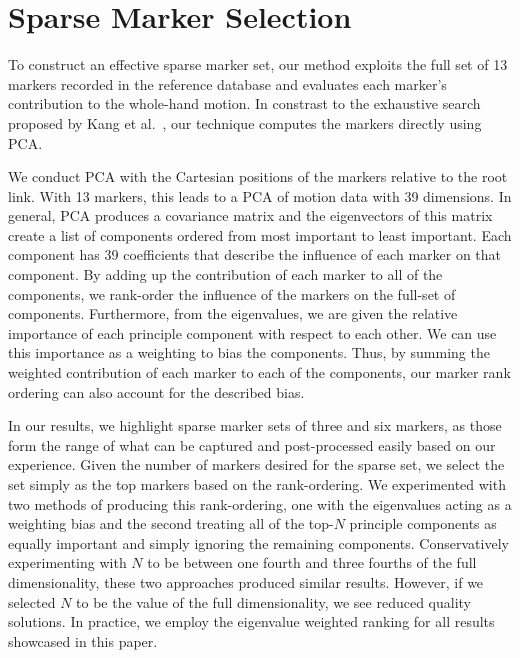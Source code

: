 
\section{Sparse Marker Selection} 
To construct an effective sparse marker set, our method exploits the full set of 13 markers recorded in the reference database and evaluates each marker's contribution to the whole-hand motion. 
In constrast to the exhaustive search proposed by Kang et al.~, our technique computes the markers directly using PCA.

We conduct PCA with the Cartesian positions of the markers relative to the root link. With 13 markers, this leads to a PCA of motion data with 39 dimensions. In general, PCA produces a covariance matrix and the eigenvectors of this matrix create a list of components ordered from most important to least important.  
%
Each component has 39 coefficients that describe the influence of each marker on that component.  By adding up the contribution of each marker to all of the components, we rank-order the influence of the markers on the full-set of components.  Furthermore, from the eigenvalues, we are given the relative importance of each principle component with respect to each other.  We can use this importance as a weighting to bias the components.  Thus, by summing the weighted contribution of each marker to each of the components, our marker rank ordering can also account for the described bias.


In our results, we highlight sparse marker sets of three and six markers, as those form the range of what can be captured and post-processed easily based on our experience. 
Given the number of markers desired for the sparse set, we select the set simply as the top markers based on the rank-ordering.  We experimented with two methods of producing this rank-ordering, one with the eigenvalues acting as a weighting bias and the second treating all of the top-$N$ principle components as equally important and simply ignoring the remaining components. Conservatively experimenting with $N$ to be between one fourth and three fourths of the full dimensionality, these two approaches produced similar results.   However, if we selected $N$ to be the value of the full dimensionality, we see reduced quality solutions.  In practice, we employ the eigenvalue weighted ranking for all results showcased in this paper.  

